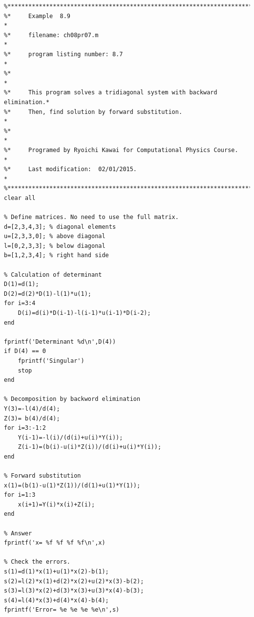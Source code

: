\bigskip
\noindent
\program
\label{prog:tridiagonal}
\footnotesize
\begin{verbatim}
%**************************************************************************
%*     Example  8.9                                                       *
%*     filename: ch08pr07.m                                               *
%*     program listing number: 8.7                                        *
%*                                                                        *
%*     This program solves a tridiagonal system with backward elimination.*
%*     Then, find solution by forward substitution.                       *
%*                                                                        *
%*     Programed by Ryoichi Kawai for Computational Physics Course.       *
%*     Last modification:  02/01/2015.                                    *
%**************************************************************************
clear all

% Define matrices. No need to use the full matrix.
d=[2,3,4,3]; % diagonal elements
u=[2,3,3,0]; % above diagonal
l=[0,2,3,3]; % below diagonal
b=[1,2,3,4]; % right hand side

% Calculation of determinant
D(1)=d(1);
D(2)=d(2)*D(1)-l(1)*u(1);
for i=3:4
    D(i)=d(i)*D(i-1)-l(i-1)*u(i-1)*D(i-2);
end

fprintf('Determinant %d\n',D(4))
if D(4) == 0
    fprintf('Singular')
    stop
end

% Decomposition by backword elimination
Y(3)=-l(4)/d(4);
Z(3)= b(4)/d(4);
for i=3:-1:2
    Y(i-1)=-l(i)/(d(i)+u(i)*Y(i));
    Z(i-1)=(b(i)-u(i)*Z(i))/(d(i)+u(i)*Y(i));
end

% Forward substitution
x(1)=(b(1)-u(1)*Z(1))/(d(1)+u(1)*Y(1));
for i=1:3
    x(i+1)=Y(i)*x(i)+Z(i);
end

% Answer
fprintf('x= %f %f %f %f\n',x)

% Check the errors. 
s(1)=d(1)*x(1)+u(1)*x(2)-b(1);
s(2)=l(2)*x(1)+d(2)*x(2)+u(2)*x(3)-b(2);
s(3)=l(3)*x(2)+d(3)*x(3)+u(3)*x(4)-b(3);
s(4)=l(4)*x(3)+d(4)*x(4)-b(4);
fprintf('Error= %e %e %e %e\n',s)
\end{verbatim}
\normalsize



